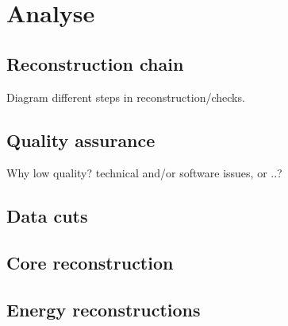 \chapter{Analyse}
\label{ch:analyse}


\section{Reconstruction chain}

Diagram different steps in reconstruction/checks.


\section{Quality assurance}


Why low quality? technical and/or software issues, or ..?


\section{Data cuts}



\section{Core reconstruction}



\section{Energy reconstructions}


